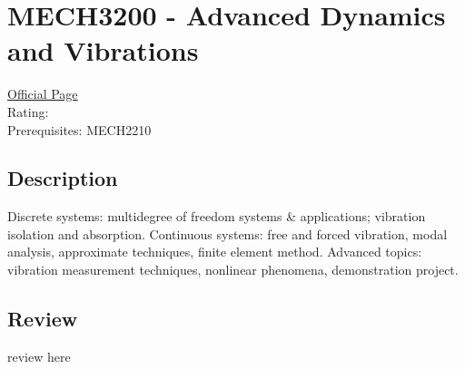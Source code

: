 \hypertarget{MECH3200}{\section{MECH3200 - Advanced Dynamics and Vibrations}}

\large
\textcolor{turbo_purple}{\href{https://my.uq.edu.au/programs-courses/course.html?course_code=MECH3200}{Official Page}} \\
Rating: \cstar\cstar\cstar\cstar\ostar \\
Prerequisites: MECH2210

\normalsize
\subsection*{Description}
Discrete systems: multidegree of freedom systems \& applications; vibration isolation and absorption.
Continuous systems: free and forced vibration, modal analysis, approximate techniques, finite element method.
Advanced topics: vibration measurement techniques, nonlinear phenomena, demonstration project.

\subsection*{Review}
review here
